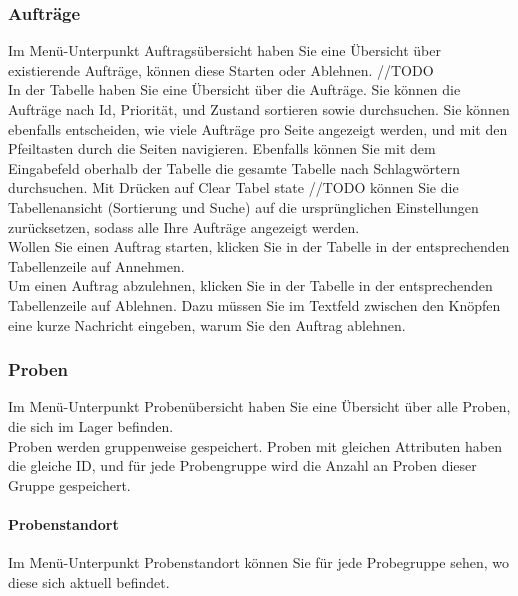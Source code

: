 \documentclass[enabledeprecatedfontcommands,fontsize=12pt,paper=a4,twoside]{scrartcl}
\begin{document}
\subsubsection{Aufträge}
Im Menü-Unterpunkt Auftragsübersicht haben Sie eine Übersicht über existierende Aufträge, können diese Starten oder Ablehnen. //TODO\\

In der Tabelle haben Sie eine Übersicht über die Aufträge. Sie können die Aufträge nach Id, Priorität, und Zustand sortieren sowie durchsuchen. Sie können ebenfalls entscheiden, wie viele Aufträge pro Seite angezeigt werden, und mit den Pfeiltasten durch die Seiten navigieren. Ebenfalls können Sie mit dem Eingabefeld oberhalb der Tabelle die gesamte Tabelle nach Schlagwörtern durchsuchen. Mit Drücken auf Clear Tabel state //TODO können Sie die Tabellenansicht (Sortierung und Suche) auf die ursprünglichen Einstellungen zurücksetzen, sodass alle Ihre Aufträge angezeigt werden. \\

Wollen Sie einen Auftrag starten, klicken Sie in der Tabelle in der entsprechenden Tabellenzeile auf Annehmen. \\

Um einen Auftrag abzulehnen, klicken Sie in der Tabelle in der entsprechenden Tabellenzeile auf Ablehnen. Dazu müssen Sie im Textfeld zwischen den Knöpfen eine kurze Nachricht eingeben, warum Sie den Auftrag ablehnen. \\

\subsubsection{Proben}
Im Menü-Unterpunkt Probenübersicht haben Sie eine Übersicht über alle Proben, die sich im Lager befinden. \\

Proben werden gruppenweise gespeichert. Proben mit gleichen Attributen haben die gleiche ID, und für jede Probengruppe wird die Anzahl an Proben dieser Gruppe gespeichert. \\

\paragraph{Probenstandort}
Im Menü-Unterpunkt Probenstandort können Sie für jede Probegruppe sehen, wo diese sich aktuell befindet. \\
\end{document}
